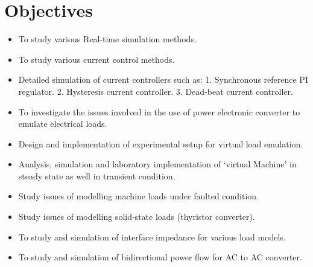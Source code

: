 \section{Objectives}
\begin{itemize}
\item To study various Real-time simulation methods.
\item To study various current control methods.
\item Detailed simulation of current controllers such as:
1. Synchronous reference PI regulator.
2. Hysteresis current controller.
3. Dead-beat current controller. 
\item To investigate the issues involved in the use of power electronic converter to emulate electrical loads.
\item Design and implementation of experimental setup for virtual load emulation.
\item Analysis, simulation and laboratory implementation of `virtual Machine' in steady state as well in transient condition.
\item Study issues of modelling machine loads under faulted condition.
\item Study issues of modelling solid-state loads (thyristor converter).
\item To study and simulation of interface impedance for various load models.
\item To study and simulation of bidirectional power flow for AC to AC converter.
\end{itemize}
